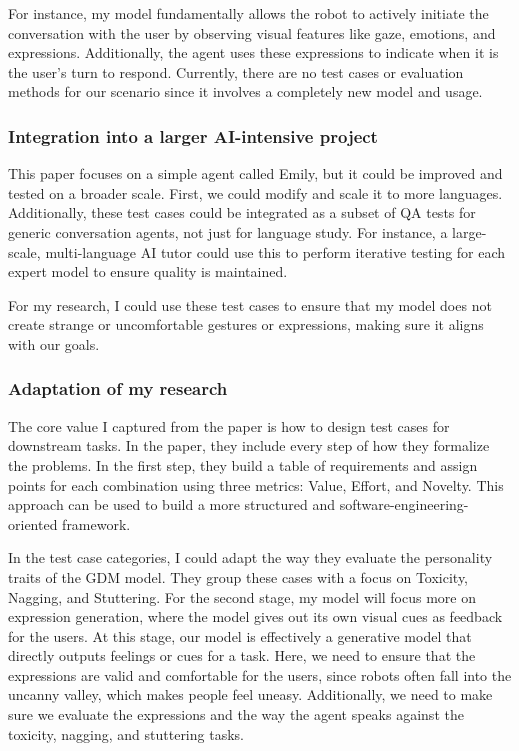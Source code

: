 \documentclass[11pt]{article}
\begin{document}
For instance, my model fundamentally allows the robot to actively initiate the conversation with the user by observing visual features like gaze, emotions, and expressions. Additionally, the agent uses these expressions to indicate when it is the user’s turn to respond. Currently, there are no test cases or evaluation methods for our scenario since it involves a completely new model and usage.

\subsubsection{Integration into a larger AI-intensive project}

This paper focuses on a simple agent called Emily, but it could be improved and tested on a broader scale. First, we could modify and scale it to more languages. Additionally, these test cases could be integrated as a subset of QA tests for generic conversation agents, not just for language study. For instance, a large-scale, multi-language AI tutor could use this to perform iterative testing for each expert model to ensure quality is maintained.

For my research, I could use these test cases to ensure that my model does not create strange or uncomfortable gestures or expressions, making sure it aligns with our goals.


\subsubsection{Adaptation of my research}

The core value I captured from the paper is how to design test cases for downstream tasks. In the paper, they include every step of how they formalize the problems. In the first step, they build a table of requirements and assign points for each combination using three metrics: Value, Effort, and Novelty. This approach can be used to build a more structured and software-engineering-oriented framework.

In the test case categories, I could adapt the way they evaluate the personality traits of the GDM model. They group these cases with a focus on Toxicity, Nagging, and Stuttering. For the second stage, my model will focus more on expression generation, where the model gives out its own visual cues as feedback for the users. At this stage, our model is effectively a generative model that directly outputs feelings or cues for a task. Here, we need to ensure that the expressions are valid and comfortable for the users, since robots often fall into the uncanny valley, which makes people feel uneasy. Additionally, we need to make sure we evaluate the expressions and the way the agent speaks against the toxicity, nagging, and stuttering tasks.
\end{document}

